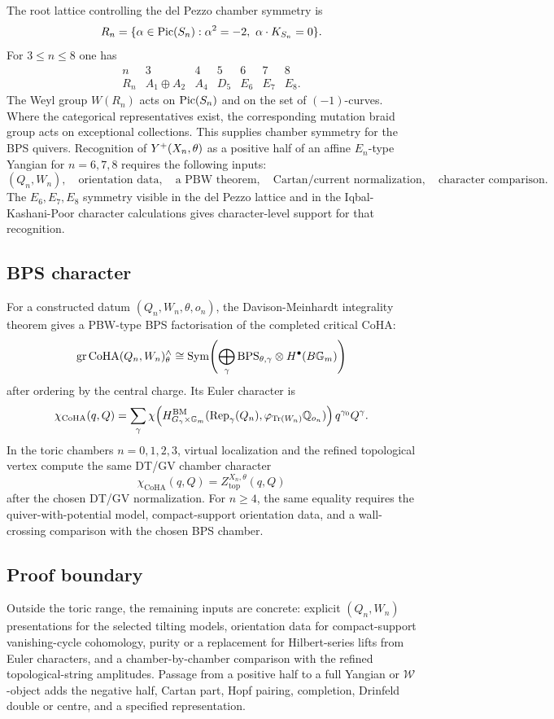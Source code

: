 The root lattice controlling the del Pezzo chamber symmetry is
\[
  R_n=\{\alpha\in\Pic(S_n):\alpha^2=-2,\ \alpha\cdot K_{S_n}=0\}.
\]
For \(3\leq n\leq8\) one has
\[
\begin{array}{c|cccccc}
n&3&4&5&6&7&8\\ \hline
R_n&A_1\oplus A_2&A_4&D_5&E_6&E_7&E_8 .
\end{array}
\]
The Weyl group \(W(R_n)\) acts on \(\mathrm{Pic}(S_n)\) and on the set of
\((-1)\)-curves. Where the categorical representatives exist, the
corresponding mutation braid group acts on exceptional collections.
This supplies chamber symmetry for the BPS quivers. Recognition of
\(Y^{+}(X_n,\theta)\) as a positive half of an affine \(E_n\)-type
Yangian for \(n=6,7,8\) requires the following inputs:
\[
  (Q_n,W_n),\quad
  \text{orientation data},\quad
  \text{a PBW theorem},\quad
  \text{Cartan/current normalization},\quad
  \text{character comparison}.
\]
The \(E_6,E_7,E_8\) symmetry visible in the del Pezzo lattice and in
the Iqbal-Kashani-Poor character calculations gives character-level
support for that recognition.

\subsection*{BPS character}

For a constructed datum \((Q_n,W_n,\theta,o_n)\), the
Davison-Meinhardt integrality theorem gives a PBW-type BPS
factorisation of the completed critical CoHA:
\[
  \operatorname{gr}\mathrm{CoHA}(Q_n,W_n)_\theta^{\wedge}
  \cong
  \mathrm{Sym}\!\left(
    \bigoplus_{\gamma}
    \mathrm{BPS}_{\theta,\gamma}\otimes H^\bullet(B\mathbb{G}_m)
  \right)
\]
after ordering by the central charge. Its Euler character is
\[
  \chi_{\mathrm{CoHA}}(q,Q)
  =
  \sum_{\gamma}
  \chi\!\left(
    H^{\mathrm{BM}}_{G_\gamma\times\mathbb{G}_m}
    (\mathrm{Rep}_\gamma(Q_n),\varphi_{\operatorname{Tr}(W_n)}\mathbb Q_{o_n})
  \right) q^{\gamma_0}Q^\gamma .
\]
In the toric chambers \(n=0,1,2,3\), virtual localization and the
refined topological vertex compute the same DT/GV chamber character
\[
  \chi_{\mathrm{CoHA}}(q,Q)
  =
  Z_{\mathrm{top}}^{X_n,\theta}(q,Q)
\]
after the chosen DT/GV normalization. For \(n\geq4\), the same equality
requires the quiver-with-potential model, compact-support orientation
data, and a wall-crossing comparison with the chosen BPS chamber.

\subsection*{Proof boundary}

Outside the toric range, the remaining inputs are concrete: explicit
\((Q_n,W_n)\) presentations for the selected tilting models, orientation
data for compact-support vanishing-cycle cohomology, purity or a
replacement for Hilbert-series lifts from Euler characters, and a
chamber-by-chamber comparison with the refined topological-string
amplitudes. Passage from a positive half to a full Yangian or
\(\mathcal W\)-object adds the negative half, Cartan part, Hopf pairing,
completion, Drinfeld double or centre, and a specified representation.
